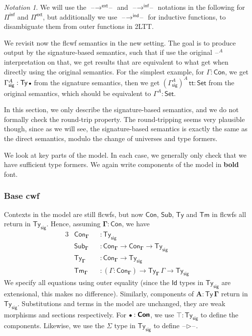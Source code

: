 \documentclass[12pt,a4paper,twoside,openany]{book}
\theoremstyle{remark}
\newtheorem{notation}{Notation}
\theoremstyle{definition}
\theoremstyle{theorem}
\newcommand{\ms}[1]{\mathsf{#1}}
\newcommand{\bs}[1]{\boldsymbol{#1}}
\newcommand{\toind}{\to^{\ms{ind}}}
\newcommand{\Tys}{\ms{Ty_{sig}}}
\newcommand{\Con}{\mathsf{Con}}
\newcommand{\Sub}{\mathsf{Sub}}
\newcommand{\Tm}{\mathsf{Tm}}
\newcommand{\Ty}{\mathsf{Ty}}
\newcommand{\Id}{\mathsf{Id}}
\renewcommand{\tt}{\mathsf{tt}}
\newcommand{\blank}{\mathord{\hspace{1pt}\text{--}\hspace{1pt}}}
\newcommand{\Set}{\mathsf{Set}}
\newcommand{\ext}{\triangleright}
\newcommand{\emptycon}{\scaleobj{.75}\bullet}
\newcommand{\Pie}{\Pi^{\mathsf{ext}}}
\newcommand{\toe}{\to^{\ms{ext}}}
\newcommand{\Piinf}{\Pi^{\mathsf{inf}}}
\newcommand{\toinf}{\to^{\ms{inf}}}
\newcommand{\bCon}{\bs{\Con}}
\newcommand{\bTy}{\bs{\Ty}}
\newcommand{\bGamma}{\bs{\Gamma}}
\newcommand{\bA}{\bs{A}}
\newcommand{\bemptycon}{\scaleobj{.75}{\bs{\bullet}}}
\begin{document}
\begin{notation}
We will use the $\blank\!\toe\!\blank$ and $\blank\!\toinf\!\blank$ notations
in the following for $\Piinf$ and $\Pie$, but additionally we use $\blank\!\toind\!\blank$
for inductive functions, to disambiguate them from outer functions in 2LTT.
\end{notation}

We revisit now the flcwf semantics in the new setting. The goal is to produce
output by the signature-based semantics, such that if use the original
$\blank^A$ interpretation on that, we get results that are equivalent to what
get when directly using the original semantics. For the simplest example, for
$\Gamma : \Con$, we get $\Gamma^A_{\ms{sig}} : \Ty\,\emptycon$ from the
signature semantics, then we get $(\Gamma^A_{\ms{sig}})^A\,\tt :
\Set$ from the original semantics, which should be equivalent to
$\Gamma^A : \Set$.

In this section, we only describe the signature-based semantics, and we do not
formally check the round-trip property. The round-tripping seems very plausible
though, since as we will see, the signature-based semantics is exactly the same
as the direct semantics, modulo the change of universes and type formers.

We look at key parts of the model. In each case, we generally only check that we
have sufficient type formers. We again write components of the model in
\textbf{bold} font.

\subsubsection{Base cwf}
Contexts in the model are still flcwfs, but now $\Con$, $\Sub$, $\Ty$ and $\Tm$ in
flcwfs all return in $\Tys$. Hence, assuming $\bGamma : \bCon$, we have
\begin{alignat*}{3}
  &\Con_{\bGamma} &&: \Tys \\
  &\Sub_{\bGamma} &&: \Con_{\bGamma} \to \Con_{\bGamma} \to \Tys \\
  &\Ty_{\bGamma}  &&: \Con_{\bGamma} \to \Tys \\
  &\Tm_{\bGamma}  &&: (\Gamma : \Con_{\bGamma}) \to \Ty_{\bGamma}\,\Gamma \to \Tys
\end{alignat*}
We specify all equations using outer equality (since the $\Id$ types in $\Tys$
are extensional, this makes no difference). Similarly, components of $\bA :
\bTy\,\bGamma$ return in $\Tys$. Substitutions and terms in the model are
unchanged, they are weak morphisms and sections respectively. For $\bemptycon :
\bCon$, we use $\top : \Tys$ to define the components. Likewise, we use
the $\Sigma$ type in $\Tys$ to define $\blank\bs{\ext}\blank$.
\end{document}
